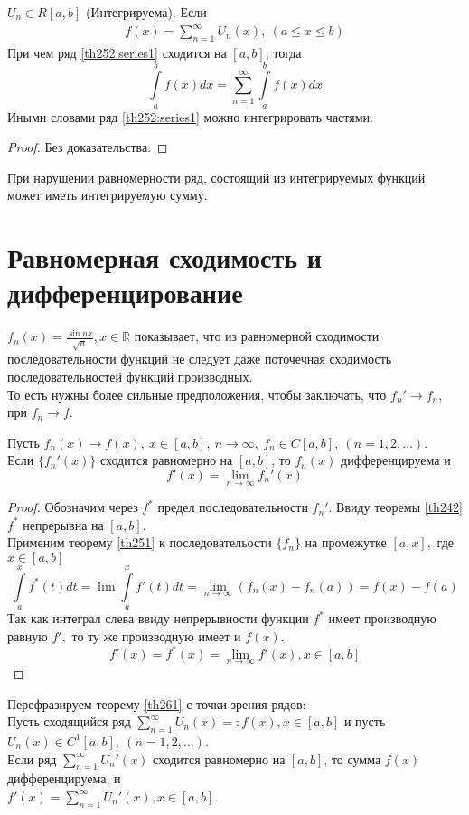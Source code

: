 \begin{theorem}
  $U_n \in R[a,b]$ (Интегрируема). Если
  \begin{gather}
    f(x) = \sum\limits_{n = 1}^{\infty} U_n(x), \ (a \leq x \leq b)
    \label{th252:series1}
  \end{gather}
  При чем ряд \eqref{th252:series1} сходится на $[a,b]$, тогда
  $$\int\limits_a^b f(x) dx = \sum\limits_{n = 1}^{\infty} \int\limits_a^b
  f(x) dx$$
  Иными словами ряд \eqref{th252:series1} можно интегрировать частями.
\end{theorem}

\begin{proof}
  Без доказательства.
\end{proof}

\begin{remark}
  При нарушении равномерности ряд, состоящий из интегрируемых функций может
  иметь интегрируемую сумму.
\end{remark}

\section{Равномерная сходимость и дифференцирование}
$f_n(x) = \frac{\sin nx}{\sqrt{n}}, x \in \mathbb{R}$ показывает, что из
равномерной сходимости последовательности функций не следует даже поточечная
сходимость последовательностей функций производных. \\
То есть нужны более сильные предположения, чтобы заключать, что $f_n' \to f_n$,
при $f_n \to f$.

\begin{theorem}
  \label{th261}
  Пусть $f_n(x) \to f(x), \ x \in [a,b], \ n \to \infty, \ f_n \in C[a,b], \
  (n = 1, 2, \dots)$. \\
  Если $\{f_n'(x)\}$ сходится равномерно на $[a,b]$, то $f_n(x)$ дифференцируема
  и $$f'(x) = \lim\limits_{n \to \infty} f_n'(x)$$
\end{theorem}

\begin{proof}
  Обозначим через $f^*$ предел последовательности $f_n'$. Ввиду теоремы \eqref{th242}
  $f^*$ непрерывна на $[a,b]$. \\
  Применим теорему \eqref{th251} к последовательости $\{f_n\}$ на промежутке
  $[a, x],$ где $x \in [a,b]$
  $$\int\limits_a^x f^*(t) dt = \lim \int\limits_a^x f'(t) dt =
  \lim\limits_{n \to \infty} (f_n(x) - f_n(a)) = f(x) - f(a)$$
  Так как интеграл слева ввиду непрерывности функции $f^*$ имеет производную
  равную $f',$ то ту же производную имеет и $f(x)$.
  $$f'(x) = f^*(x) = \lim\limits_{n \to \infty} f'(x), x \in [a,b]$$
\end{proof}

Перефразируем теорему \eqref{th261} с точки зрения рядов: \\
Пусть сходящийся ряд $\sum\limits_{n = 1}^{\infty} U_n(x) =: f(x), x \in [a,b]$
и пусть $U_n(x) \in C^1[a,b], \ (n = 1, 2, \dots)$.\\
Если ряд $\sum\limits_{n = 1}^{\infty} U_n'(x)$ сходится равномерно на $[a,b]$,
то сумма $f(x)$ дифференцируема, и \\
$f'(x) = \sum\limits_{n = 1}^{\infty} U_n'(x), x \in [a,b]$.

